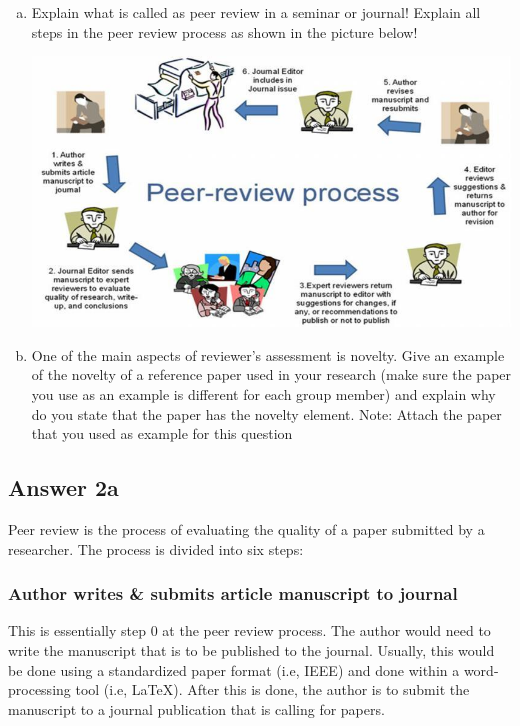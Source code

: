 \documentclass[
  11pt, %
]{assignment}
\begin{document}
\begin{problem}
\begin{enumerate}[a.]
  \item Explain what is called as peer review in a seminar or journal! Explain all steps in the peer review process as shown in the picture below!

        \includegraphics[width=0.9\linewidth]{graphics/20220618023028_COMP6696001_FIN_GCQuestion.jpg}

  \item One of the main aspects of reviewer's assessment is novelty. Give an example of the novelty of a reference paper used in your research (make sure the paper you use as an example is different for each group member) and explain why do you state that the paper has the novelty element. Note: Attach the paper that you used as example for this question
\end{enumerate}
\end{problem}

\subsection*{Answer 2a}

Peer review is the process of evaluating the quality of a paper submitted by a researcher. The process is divided into six steps:

\subsubsection*{Author writes \& submits article manuscript to journal}

This is essentially step 0 at the peer review process. The author would need to write the manuscript that is to be published to the journal. Usually, this would be done using a standardized paper format (i.e, IEEE) and done within a word-processing tool (i.e, \LaTeX). After this is done, the author is to submit the manuscript to a journal publication that is calling for papers.
\end{document}

